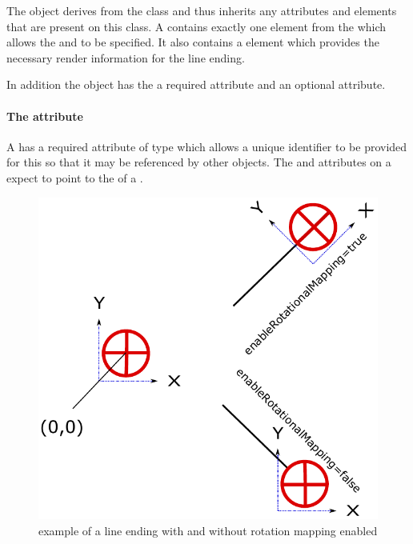 The \LineEnding object derives from the \GraphicalPrimitiveTwoD class
and thus inherits any attributes and elements that are present on this
class.
A \LineEnding contains exactly one  element from the \LayoutPackage which allows the  and  to be specified. It also contains a \RenderGroup element which provides the necessary render information for the line ending.
  
In addition the \LineEnding object has the a required  attribute and an optional  attribute.

\paragraph{The \fixttspace{} attribute}

A \LineEnding has a required attribute  of type
 which allows a unique identifier to be provided for this \LineEnding so that it may be referenced by other objects. The  and  attributes on a \RenderCurve expect to point to the  of a \LineEnding.

\begin{figure}[!ht]
\begin{center}
\includegraphics{figures/EnableRotationalMapping.pdf}
\end{center}
\caption{example of a line ending with and without rotation mapping enabled}
\label{EnableRotationalMapping}
\end{figure}

